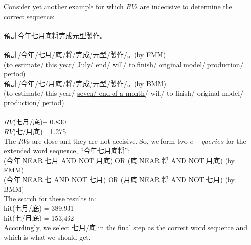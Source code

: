 {Consider yet another example for which $RV$s are indecisive to determine the correct sequence:\\
\hspace*{2zw}{\bf Input sentence}\\
\hspace*{3zw}    {\small 預計今年七月底将完成元型製作。}\\
\hspace*{2zw}{\bf Ambiguous sequences}\\
\hspace*{3zw}    {\small 預計}/{\small 今年}/\underline{{\small 七月}/{\small 底}}/{\small 将}/{\small 完成}/{\small 元型}/{\small 製作}/{\small 。}(by FMM)\\
\hspace*{3zw}    (to estimate/ this year/ \underline{July/ end}/ will/ to finish/ original model/ production/\\
\hspace*{3zw}    period)\\
\hspace*{3zw}    {\small 預計}/{\small 今年}/\underline{{\small 七}/{\small 月底}}/{\small 将}/{\small 完成}/{\small 元型}/{\small 製作}/{\small 。}(by BMM)\\
\hspace*{3zw}    (to estimate/ this year/ \underline{seven/ end of a month}/ will/ to finish/ original model/\\
\hspace*{3zw}    production/ period)\\
\hspace*{2zw}{\bf Relevancy Values}\\
\hspace*{3zw}    $RV$({\small 七月}/{\small 底})= 0.830\\
\hspace*{3zw}    $RV$({\small 七}/{\small 月底})= 1.275\\
The $RV$s are close and they are not decisive. So, we form two $e-queries$ for the extended word sequence, ``{\small 今年七月底将}'': \\
\hspace*{3zw}({\small 今年} NEAR {\small 七月} AND NOT {\small 月底}) OR ({\small 底} NEAR {\small 将} AND NOT {\small 月底})  (by FMM)\\
\hspace*{3zw}({\small 今年} NEAR {\small 七} AND NOT {\small 七月}) OR ({\small 月底} NEAR {\small 将} AND NOT {\small 七月})  (by BMM)\\
The search for these results in: \\
\hspace*{3zw}hit({\small 七月}/{\small 底}) = 389,931\\
\hspace*{3zw}hit({\small 七}/{\small 月底}) = 153,462\\
Accordingly, we select {\small 七月}/{\small 底} in the final step as the correct word sequence and which is what we should get.

}
